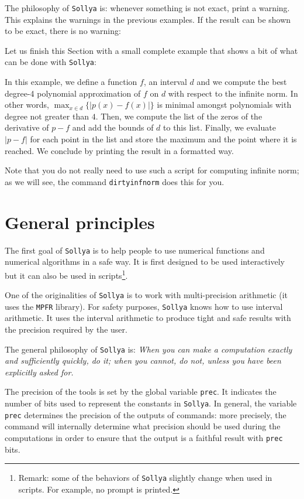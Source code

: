 \documentclass[a4paper]{article}
\newcommand{\com}[1]{\texttt{#1}}
\newcommand{\key}[1]{\texttt{#1}}
\newcommand{\sollya}{\texttt{Sollya}\xspace}
\begin{document}


The philosophy of \sollya is: whenever something is not exact, print a warning. This explains the warnings in the previous examples. If the result can be shown to be exact, there is no warning:



Let us finish this Section with a small complete example that shows a bit of what can be done with \sollya:



In this example, we define a function $f$, an interval $d$ and we compute the best degree-4 polynomial approximation of $f$ on $d$ with respect to the infinite norm. In other words, $\max_{x \in d} \{|p(x)-f(x)|\}$ is minimal amongst polynomials with degree not greater than $4$. Then, we compute the list of the zeros of the derivative of $p-f$ and add the bounds of $d$ to this list. Finally, we evaluate $|p-f|$ for each point in the list and store the maximum and the point where it is reached. We conclude by printing the result in a formatted way.

Note that you do not really need to use such a script for computing infinite norm; as we will see, the command \com{dirtyinfnorm} does this for you.

\section{General principles}
The first goal of \sollya is to help people to use numerical functions and numerical algorithms in a safe way. It is first designed to be used interactively but it can also be used in scripts\footnote{Remark: some of the behaviors of \sollya slightly change when used in scripts. For example, no prompt is printed.}.

One of the originalities of \sollya is to work with multi-precision arithmetic (it uses the \texttt{MPFR} library). For safety purposes, \sollya knows how to use interval arithmetic. It uses the interval arithmetic to produce tight and safe results with the precision required by the user.

The general philosophy of \sollya is: \emph{When you can make a computation exactly and sufficiently quickly, do it; when you cannot, do not, unless you have been explicitly asked for.}

The precision of the tools is set by the global variable \key{prec}. It indicates the number of bits used to represent the constants in \sollya. In general, the variable \key{prec} determines the precision of the outputs of commands: more precisely, the command will internally determine what precision should be used during the computations in order to ensure that the output is a faithful result with \key{prec} bits.
\end{document}
